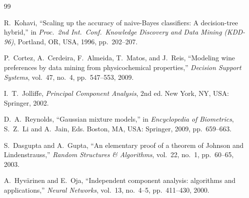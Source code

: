 \documentclass[conference]{IEEEtran}
\begin{document}
\begin{thebibliography}{99}

R.~Kohavi,
``Scaling up the accuracy of naive-Bayes classifiers: A decision-tree
hybrid,''
in \emph{Proc.\ 2nd Int.\ Conf.\ Knowledge Discovery and Data Mining
(KDD-96)}, Portland, OR, USA, 1996, pp.~202--207.

P.~Cortez, A.~Cerdeira, F.~Almeida, T.~Matos, and J.~Reis,
``Modeling wine preferences by data mining from physicochemical
properties,''
\emph{Decision Support Systems}, vol.~47, no.~4, pp.~547--553, 2009.

I.~T.~Jolliffe,
\emph{Principal Component Analysis}, 2nd ed.
New York, NY, USA: Springer, 2002.

D.~A.~Reynolds,
``Gaussian mixture models,''
in \emph{Encyclopedia of Biometrics}, S.~Z.~Li and A.~Jain, Eds.
Boston, MA, USA: Springer, 2009, pp.~659--663.

S.~Dasgupta and A.~Gupta,
``An elementary proof of a theorem of Johnson and Lindenstrauss,''
\emph{Random Structures \& Algorithms}, vol.~22, no.~1,
pp.~60--65, 2003.

A.~Hyv{\"a}rinen and E.~Oja,
``Independent component analysis: algorithms and applications,''
\emph{Neural Networks}, vol.~13, no.~4--5, pp.~411--430, 2000.

\end{thebibliography}
\end{document}
